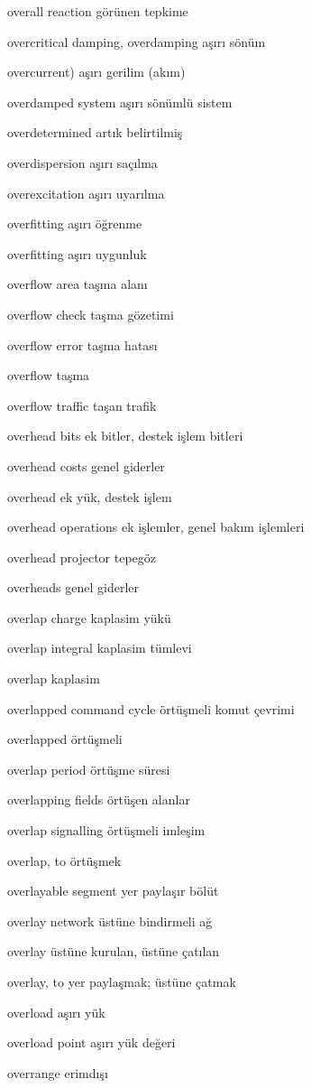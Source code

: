 \documentclass[12pt,fleqn]{article}\usepackage{../../common}
\begin{document}
overall reaction görünen tepkime

overcritical damping, overdamping aşırı sönüm

overcurrent) aşırı gerilim (akım)

overdamped system aşırı sönümlü sistem

overdetermined artık belirtilmiş

overdispersion aşırı saçılma

overexcitation aşırı uyarılma

overfitting aşırı öğrenme

overfitting aşırı uygunluk

overflow area taşma alanı

overflow check taşma gözetimi

overflow error taşma hatası

overflow taşma

overflow traffic taşan trafik

overhead bits ek bitler, destek işlem bitleri

overhead costs genel giderler

overhead ek yük, destek işlem

overhead operations ek işlemler, genel bakım işlemleri

overhead projector tepegöz

overheads genel giderler

overlap charge kaplasim yükü

overlap integral kaplasim tümlevi

overlap kaplasim

overlapped command cycle örtüşmeli komut çevrimi

overlapped örtüşmeli

overlap period örtüşme süresi

overlapping fields örtüşen alanlar

overlap signalling örtüşmeli imleşim

overlap, to örtüşmek

overlayable segment yer paylaşır bölüt

overlay network üstüne bindirmeli ağ

overlay üstüne kurulan, üstüne çatılan

overlay, to yer paylaşmak; üstüne çatmak

overload aşırı yük

overload point aşırı yük değeri

overrange erimdışı
\end{document}
